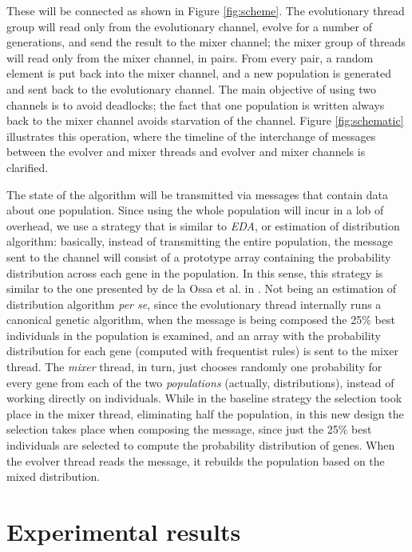 \documentclass[runningheads]{llncs}\usepackage[]{graphicx}\usepackage[]{color}
\begin{document}
These will be connected as shown in Figure \ref{fig:scheme}. The
evolutionary thread group will read only from the evolutionary channel,
evolve for a number of generations, and send the result to the mixer
channel; the mixer group of threads will read only from the mixer
channel, in pairs. From every pair, a random element is put back into
the mixer channel, and a new population is generated and sent back to
the evolutionary channel. The main objective of using two channels is
to avoid deadlocks; the fact that one population is written always
back to the mixer channel avoids starvation of the channel. Figure \ref{fig:schematic} illustrates this operation, where the
timeline of the interchange of messages between the evolver and mixer
threads and evolver and mixer channels is clarified.

The state of the algorithm will be transmitted via messages that
contain data about one population. Since using the whole population
will incur in a lob of overhead, we use a strategy that is similar to {\em EDA}, or estimation of distribution algorithm: basically, instead of transmitting the entire population, the message sent to the channel will consist of a prototype array containing the probability distribution across each gene in the population. In this sense,
  this strategy is similar to the one presented by de la Ossa et
  al. in \cite{10.1007/978-3-540-30217-9_25}. Not being an estimation
  of distribution algorithm {\em per se}, since the evolutionary
  thread internally runs a canonical genetic algorithm, when the message is being
  composed the 25\% best individuals in the
  population is examined, and an array with the
  probability distribution for each gene (computed with frequentist rules) is sent to the mixer thread. The {\em mixer} thread, in turn, just chooses randomly one probability for every gene from
  each of the two {\em populations} (actually, distributions), instead
  of working directly on individuals. While in the baseline strategy the
  selection took place in the mixer thread, eliminating half the
  population, in this new design the selection takes place when composing
  the message, since just the 25\% best individuals are selected to
  compute the probability distribution of genes. When the evolver
  thread reads the message, it rebuilds the population based on the mixed 
  distribution.

\section{Experimental results}
\label{sec:exp}
\end{document}
